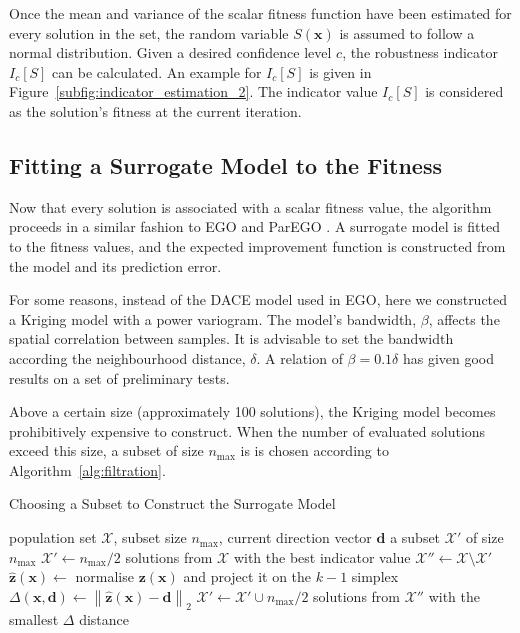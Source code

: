 \documentclass[10pt]{llncs}
\newcommand{\brr}[1]{{\left({#1}\right)}} %
\newcommand{\norm}[2]{\left\|{#1}\right\|_{#2}} %
\newcommand{\Ic}[1]{I_c\!\left[{#1}\right]} %
\newcommand{\vx}{\mathbf{x}} %
\newcommand{\vz}{\mathbf{z}} %
\newcommand{\vd}{\mathbf{d}} %
\newcommand{\XSet}{\mathcal{X}} %
\begin{document}
Once the mean and variance of the scalar fitness function have been estimated for every solution in the set, the random variable $S\brr{\vx}$ is assumed to follow a normal distribution.
Given a desired confidence level $c$, the robustness indicator $\Ic{S}$ can be calculated.
An example for $\Ic{S}$ is given in Figure~\ref{subfig:indicator_estimation_2}.
The indicator value $\Ic{S}$ is considered as the solution's fitness at the current iteration.

\subsection{Fitting a Surrogate Model to the Fitness}
\label{subsec:Kriging}
Now that every solution is associated with a scalar fitness value, the algorithm proceeds in a similar fashion to EGO and ParEGO \cite{Jones1998Efficient,knowles2005multiobjective}.
A surrogate model is fitted to the fitness values, and the expected improvement function is constructed from the model and its prediction error.

For some  reasons, instead of the DACE model used in EGO, here we constructed a Kriging model with a power variogram.
The model's bandwidth, $\beta$, affects the spatial correlation between samples.
It is advisable to set the bandwidth according the neighbourhood distance, $\delta$.
A relation of $\beta=0.1\delta$ has given good results on a set of preliminary tests.

Above a certain size (approximately 100 solutions), the Kriging model becomes prohibitively expensive to construct.
When the number of evaluated solutions exceed this size, a subset of size $n_\text{max}$ is is chosen according to Algorithm~\ref{alg:filtration}.

\begin{algorithm}
\caption{Choosing a Subset to Construct the Surrogate Model}
\label{alg:filtration}
\begin{algorithmic}[1]
	\Require population set $\XSet$, subset size $n_\text{max}$, current direction vector $\vd$
	\Ensure a subset $\XSet'$ of size $n_\text{max}$
	\State $\XSet' \leftarrow n_\text{max}/2$ solutions from $\XSet$ with the best indicator value
	\State $\XSet'' \leftarrow \XSet \setminus \XSet'$
	\ForAll{$\vx \in \XSet''$}
		\State $\hat{\vz}\brr{\vx} \leftarrow$ normalise $\vz\brr{\vx}$ and project it on the $k-1$ simplex
		\State $\Delta\brr{\vx, \vd} \leftarrow \norm{\hat{\vz}\brr{\vx} - \vd}{2}$
	\EndFor
	\State $\XSet' \leftarrow \XSet' \cup n_\text{max}/2$ solutions from $\XSet''$ with the smallest $\Delta$ distance
\end{algorithmic}
\end{algorithm}
\end{document}
